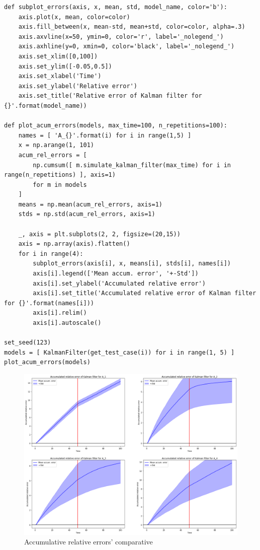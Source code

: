 \documentclass[a4paper]{article}
\begin{document}
\begin{verbatim}
def subplot_errors(axis, x, mean, std, model_name, color='b'):
	axis.plot(x, mean, color=color)
	axis.fill_between(x, mean-std, mean+std, color=color, alpha=.3)
	axis.axvline(x=50, ymin=0, color='r', label='_nolegend_')
	axis.axhline(y=0, xmin=0, color='black', label='_nolegend_')
	axis.set_xlim([0,100])
	axis.set_ylim([-0.05,0.5])
	axis.set_xlabel('Time')
	axis.set_ylabel('Relative error')
	axis.set_title('Relative error of Kalman filter for {}'.format(model_name))
	
def plot_acum_errors(models, max_time=100, n_repetitions=100):
	names = [ 'A_{}'.format(i) for i in range(1,5) ]
	x = np.arange(1, 101)
	acum_rel_errors = [
		np.cumsum([ m.simulate_kalman_filter(max_time) for i in range(n_repetitions) ], axis=1)
		for m in models
	]
	means = np.mean(acum_rel_errors, axis=1)
	stds = np.std(acum_rel_errors, axis=1)
	
	_, axis = plt.subplots(2, 2, figsize=(20,15))  
	axis = np.array(axis).flatten()
	for i in range(4):
		subplot_errors(axis[i], x, means[i], stds[i], names[i])
		axis[i].legend(['Mean accum. error', '+-Std'])
		axis[i].set_ylabel('Accumulated relative error')
		axis[i].set_title('Accumulated relative error of Kalman filter for {}'.format(names[i]))
		axis[i].relim() 
		axis[i].autoscale()
		
set_seed(123) 
models = [ KalmanFilter(get_test_case(i)) for i in range(1, 5) ]
plot_acum_errors(models)
\end{verbatim}

\begin{figure}[H]
	\includegraphics[scale=.6]{figures/kalman_acum}
	\centering
	\caption{Accumulative relative errors' comparative}
\end{figure}
\end{document}
